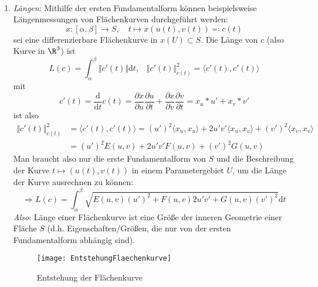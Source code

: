 \begin{remark}
 \
 \begin{enumerate}

   \item \emph{Längen}: Mithilfe der ersten Fundamentalform können beispielsweise Längenmessungen von Flächenkurven durchgeführt werden:
  \begin{equation*}
    x: [\alpha, \beta] \to S, \quad t \mapsto x(u(t), v(t)) \eqqcolon c(t)
  \end{equation*}
  sei eine differenzierbare Flächenkurve in \( x(U) \subset S \). Die Länge von \( c \) (also Kurve in \( \R^3 \)) ist
  \begin{equation*}
    L(c) = \int_\alpha^\beta \Vert c'(t) \Vert \text{d}t\text{,} \quad \Vert c'(t) \Vert_{c(t)}^2 = \langle c'(t), c'(t) \rangle
  \end{equation*}
  mit
  \begin{equation*}
    c'(t) = \frac{\text{d}}{\text{d}t}c(t) = \frac{\partial x}{\partial u} \frac{\partial u}{\partial t} + \frac{\partial x}{\partial v} \frac{\partial v}{\partial t} = x_u * u' + x_v * v'
  \end{equation*}
  ist also
  \begin{align*}
    \Vert c'(t) \Vert_{c(t)}^2 &= \langle c'(t), c'(t) \rangle = {(u')}^2\langle x_u, x_u \rangle + 2u'v'\langle x_u, x_v \rangle + {(v')}^2\langle x_v, x_v \rangle \\
    &= {(u')}^2E(u,v) + 2{u'}{v'}F(u,v) + {(v')}^2G(u,v)
  \end{align*}
  Man braucht also nur die erste Fundamentalform von \( S \) und die Beschreibung der Kurve \( t \mapsto (u(t),v(t)) \) in einem Parametergebiet \( U \), um die Länge der Kurve ausrechnen zu können:
  \begin{equation*}
    \Rightarrow L(c) = \int_\alpha^\beta \sqrt{E(u,v){(u')}^2 + F(u,v)2u'v' + G(u,v){(v')}^2}\text{d}t
  \end{equation*}
  \emph{Also}: Länge einer Flächenkurve ist eine Größe der inneren Geometrie einer Fläche \( S \) (d.h. Eigenschaften/Größen, die nur von der ersten Fundamentalform abhängig sind).

  \begin{figure}[H]
    \texttt{[image: EntstehungFlaechenkurve]}
    \caption{Entstehung der Flächenkurve}
  \end{figure}


\end{enumerate}
\end{remark}
